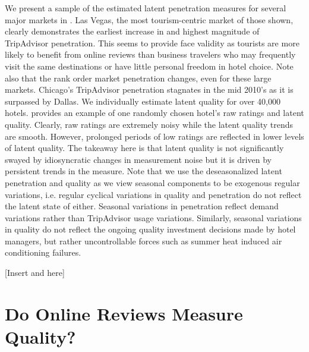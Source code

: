 \documentclass[mksc,blindrev]{informs3} %
\begin{document}

We present a sample of the estimated latent penetration measures for several major markets in . Las Vegas, the most tourism-centric market of those shown, clearly demonstrates the earliest increase in and highest magnitude of TripAdvisor penetration. This seems to provide face validity as tourists are more likely to benefit from online reviews than business travelers who may frequently visit the same destinations or have little personal freedom in hotel choice. Note also that the rank order market penetration changes, even for these large markets. Chicago's TripAdvisor penetration stagnates in the mid 2010's as it is surpassed by Dallas. We individually estimate latent quality for over 40,000 hotels.  provides an example of one randomly chosen hotel's raw ratings and latent quality. Clearly, raw ratings are extremely noisy while the latent quality trends are smooth. However, prolonged periods of low ratings are reflected in lower levels of latent quality. The takeaway here is that latent quality is not significantly swayed by idiosyncratic changes in measurement noise but it is driven by persistent trends in the measure. Note that we use the deseasonalized latent penetration and quality as we view seasonal components to be exogenous regular variations, i.e. regular cyclical variations in quality and penetration do not reflect the latent state of either. Seasonal variations in penetration reflect demand variations rather than TripAdvisor usage variations. Similarly, seasonal variations in quality do not reflect the ongoing quality investment decisions made by hotel managers, but rather uncontrollable forces such as summer heat induced air conditioning failures.

[Insert  and  here]

\section{Do Online Reviews Measure Quality?} \label{sec:quality}
\end{document}
